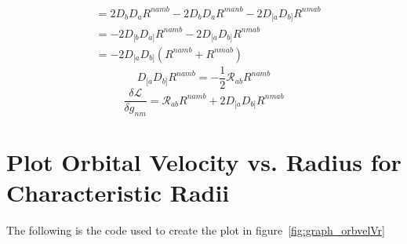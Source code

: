 \documentclass[aps,prd,preprint]{revtex4-1}
\begin{document}
\begin{fleqn}
\begin{equation*}
\begin{aligned}
    &= 2 D_b D_a R^{namb} - 2 D_b D_a R^{manb} - 2 D_{[a} D_{b]} R^{nmab} \\
    &= -2 D_{[b} D_{a]} R^{namb} - 2 D_{[a} D_{b]} R^{nmab} \\
    &= - 2 D_{[a} D_{b]} \left( R^{namb} + R^{nmab} \right)
\end{aligned}
\end{equation*}
\begin{equation*}
    D_{[a} D_{b]} R^{namb} = -\frac{1}{2} \mathcal{R}_{ab}R^{namb}
\end{equation*}
\begin{equation*}
\boxed{
    \frac{\delta \mathcal{L}}{\delta g_{nm}} = \mathcal{R}_{ab} R^{namb} + 2 D_{[a} D_{b]} R^{nmab}
}
\end{equation*}

\section{Plot Orbital Velocity vs. Radius for Characteristic Radii}\label{app.plot_code}
The following is the code used to create the plot in figure~\ref{fig:graph_orbvelVr}
\\


\end{fleqn}


\end{document}
